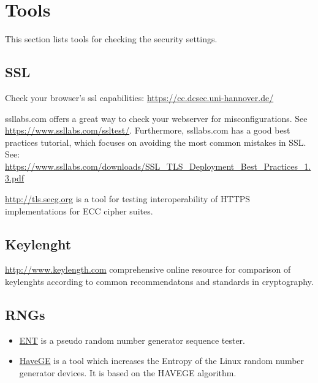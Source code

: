 \section{Tools}

This section lists tools for checking the security settings.

\subsection{SSL}

Check your browser's ssl capabilities: \url{https://cc.dcsec.uni-hannover.de/}


ssllabs.com offers a great way to check your webserver for misconfigurations. See \url{https://www.ssllabs.com/ssltest/}.
Furthermore, ssllabs.com has a good best practices tutorial, which focuses on avoiding the most common mistakes in SSL.
See: \url{https://www.ssllabs.com/downloads/SSL_TLS_Deployment_Best_Practices_1.3.pdf}

\url{http://tls.secg.org} is a tool for testing interoperability of HTTPS implementations for ECC cipher suites.

\subsection{Keylenght}

\url{http://www.keylength.com} comprehensive online resource for comparison of keylenghts according to common recommendatons and standards in cryptography.

\subsection{RNGs}

\begin{itemize}
\item \href{http://www.fourmilab.ch/random/}{ENT} is a pseudo random number generator sequence tester.  
\item \href{http://www.issihosts.com/haveged/}{HaveGE} is a tool which increases the Entropy of the Linux random number generator devices. It is based on the HAVEGE algorithm.
\end{itemize}



